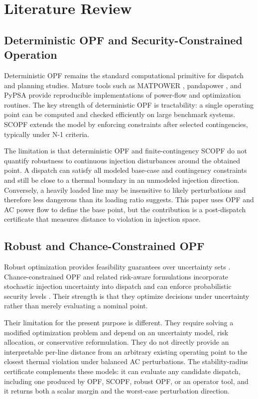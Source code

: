 \documentclass[11pt]{article}
\begin{document}
\section{Literature Review}
\label{sec:literature}

\subsection{Deterministic OPF and Security-Constrained Operation}

Deterministic OPF remains the standard computational primitive for dispatch and planning studies. Mature tools such as MATPOWER \citep{ZimmermanMurilloSanchezThomas2011}, pandapower \citep{ThurnerEtAl2018}, and PyPSA \citep{BrownHorschSchlachtberger2018} provide reproducible implementations of power-flow and optimization routines. The key strength of deterministic OPF is tractability: a single operating point can be computed and checked efficiently on large benchmark systems. SCOPF extends the model by enforcing constraints after selected contingencies, typically under N-1 criteria.

The limitation is that deterministic OPF and finite-contingency SCOPF do not quantify robustness to continuous injection disturbances around the obtained point. A dispatch can satisfy all modeled base-case and contingency constraints and still be close to a thermal boundary in an unmodeled injection direction. Conversely, a heavily loaded line may be insensitive to likely perturbations and therefore less dangerous than its loading ratio suggests. This paper uses OPF and AC power flow to define the base point, but the contribution is a post-dispatch certificate that measures distance to violation in injection space.

\subsection{Robust and Chance-Constrained OPF}

Robust optimization provides feasibility guarantees over uncertainty sets \citep{BenTalNemirovski1998,BertsimasSim2004}. Chance-constrained OPF and related risk-aware formulations incorporate stochastic injection uncertainty into dispatch and can enforce probabilistic security levels \citep{BienstockChertkovHarnett2014,RoaldEtAl2016,LubinBackhausDvorkin2016}. Their strength is that they optimize decisions under uncertainty rather than merely evaluating a nominal point.

Their limitation for the present purpose is different. They require solving a modified optimization problem and depend on an uncertainty model, risk allocation, or conservative reformulation. They do not directly provide an interpretable per-line distance from an arbitrary existing operating point to the closest thermal violation under balanced AC perturbations. The stability-radius certificate complements these models: it can evaluate any candidate dispatch, including one produced by OPF, SCOPF, robust OPF, or an operator tool, and it returns both a scalar margin and the worst-case perturbation direction.
\end{document}
